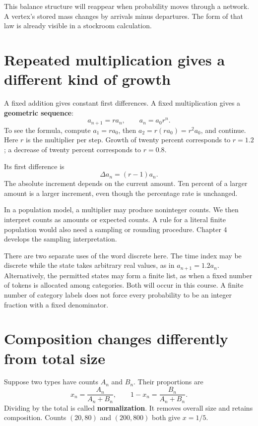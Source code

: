 \documentclass[11pt,oneside,openany]{book}
\theoremstyle{definition}
\theoremstyle{remark}
\numberwithin{equation}{chapter}
\begin{document}
This balance structure will reappear when probability moves through a network. A vertex's stored mass changes by arrivals minus departures. The form of that law is already visible in a stockroom calculation.

\section{Repeated multiplication gives a different kind of growth}\label{ch01-repeated-multiplication-gives-a-different-kind-of-growth}

A fixed addition gives constant first differences. A fixed multiplication gives a \textbf{geometric sequence}: \[a_{n+1}=r a_n,\qquad a_n=a_0r^n.\] To see the formula, compute \(a_1=ra_0\), then \(a_2=r(ra_0)=r^2a_0\), and continue. Here \(r\) is the multiplier per step. Growth of twenty percent corresponds to \(r=1.2\); a decrease of twenty percent corresponds to \(r=0.8\).

Its first difference is \[\Delta a_n=(r-1)a_n.\] The absolute increment depends on the current amount. Ten percent of a larger amount is a larger increment, even though the percentage rate is unchanged.

In a population model, a multiplier may produce noninteger counts. We then interpret counts as amounts or expected counts. A rule for a literal finite population would also need a sampling or rounding procedure. Chapter 4 develops the sampling interpretation.

There are two separate uses of the word discrete here. The time index may be discrete while the state takes arbitrary real values, as in \(a_{n+1}=1.2a_n\). Alternatively, the permitted states may form a finite list, as when a fixed number of tokens is allocated among categories. Both will occur in this course. A finite number of category labels does not force every probability to be an integer fraction with a fixed denominator.

\section{Composition changes differently from total size}\label{ch01-composition-changes-differently-from-total-size}

Suppose two types have counts \(A_n\) and \(B_n\). Their proportions are \[x_n=\frac{A_n}{A_n+B_n},\qquad 1-x_n=\frac{B_n}{A_n+B_n}.\] Dividing by the total is called \textbf{normalization}. It removes overall size and retains composition. Counts \((20,80)\) and \((200,800)\) both give \(x=1/5\).
\end{document}
